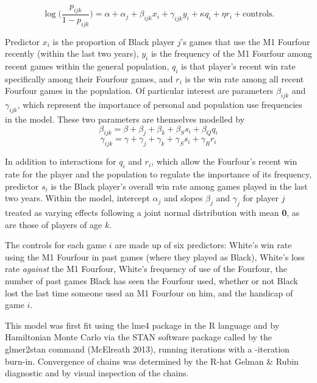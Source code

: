 \documentclass[12pt]{article}
\begin{document}
\begin{equation} \label{eq:model}
  \log\bigg(\frac{p_{ijk}}{1-p_{ijk}}\bigg) = \alpha + \alpha_j + \beta_{ijk}x_i + \gamma_{ijk}y_i + \kappa q_i + \eta r_i + \textrm{controls}.
\end{equation}

Predictor $x_i$ is the proportion of Black player $j$'s games that use the M1 Fourfour recently (within the last two years), $y_i$ is the frequency of the M1 Fourfour among recent games within the general population, $q_i$ is that player's recent win rate specifically among their Fourfour games, and $r_i$ is the win rate among all recent Fourfour games in the population. Of particular interest are parameters $\beta_{ijk}$ and $\gamma_{ijk}$, which represent the importance of personal and population use frequencies in the model. These two parameters are themselves modelled by
$$
  \beta_{ijk} = \beta + \beta_j + \beta_k + \beta_{S} s_{i} + \beta_{Q} q_{i}
$$
$$
  \gamma_{ijk} = \gamma + \gamma_j + \gamma_k + \gamma_{S} s_{i} + \gamma_{R} r_{i}
$$

In addition to interactions for $q_i$ and $r_i$, which allow the Fourfour's recent win rate for the player and the population to regulate the importance of its frequency, predictor $s_i$ is the Black player's overall win rate among games played in the last two years. Within the model, intercept $\alpha_j$ and slopes $\beta_j$ and $\gamma_j$ for player $j$ treated as varying effects following a joint normal distribution with mean \textbf{0}, as are those of players of age $k$.

The controls for each game $i$ are made up of six predictors: White's win rate using the M1 Fourfour in past games (where they played as Black), White's loss rate \textit{against} the M1 Fourfour, White's frequency of use of the Fourfour, the number of past games Black has seen the Fourfour used, whether or not Black lost the last time someone used an M1 Fourfour on him, and the handicap of game $i$.

This model was first fit using the lme4 package in the R language and by Hamiltonian Monte Carlo via the STAN software package called by the glmer2stan command (McElreath 2013), running \nIterations{} iterations with a \nBurnIn-iteration burn-in. Convergence of chains was determined by the R-hat Gelman \& Rubin diagnostic \citep{stan2013stan} and by visual inspection of the chains.
\end{document}
